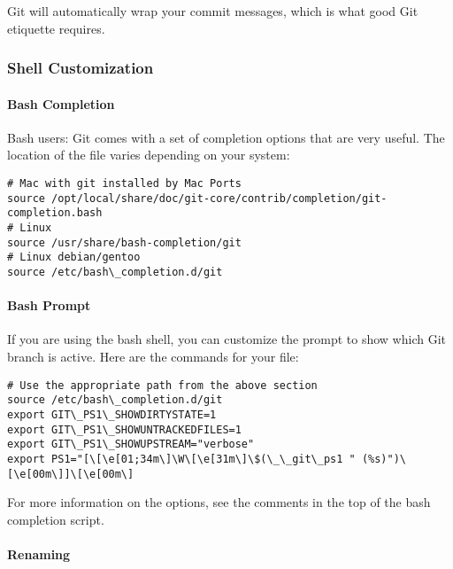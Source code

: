 Git will automatically wrap your commit messages, which is what good Git
etiquette requires.


\subsubsection{Shell Customization}
\label{subsubsec:ShellCustomization}

\paragraph{Bash Completion}
\label{par:BashCompletion}

Bash users: Git comes with a set of completion options that are very useful. The
location of the file varies depending on your system:

\begin{verbatim}
# Mac with git installed by Mac Ports
source /opt/local/share/doc/git-core/contrib/completion/git-completion.bash
# Linux
source /usr/share/bash-completion/git
# Linux debian/gentoo
source /etc/bash\_completion.d/git
\end{verbatim}


\paragraph{Bash Prompt}
\label{par:BashPrompt}

If you are using the bash shell, you can customize the prompt to show which Git
branch is active. Here are the commands for your  file:

\begin{verbatim}
# Use the appropriate path from the above section
source /etc/bash\_completion.d/git
export GIT\_PS1\_SHOWDIRTYSTATE=1
export GIT\_PS1\_SHOWUNTRACKEDFILES=1
export GIT\_PS1\_SHOWUPSTREAM="verbose"
export PS1="[\[\e[01;34m\]\W\[\e[31m\]\$(\_\_git\_ps1 " (%s)")\[\e[00m\]]\[\e[00m\]
\end{verbatim}

For more information on the options, see the comments in the top of the bash
completion script.

\paragraph{Renaming}
\label{par:Renaming}

